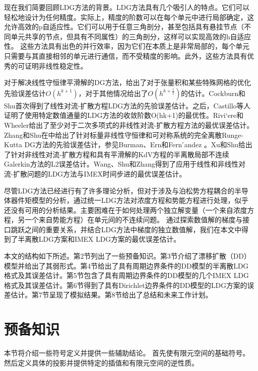 现在我们简要回顾LDG方法的背景。LDG方法具有几个吸引人的特点\parencite{xu2010local}。它们可以轻松地设计为任何精度。实际上，精度的阶数可以在每个单元中进行局部确定，这允许高效的p自适应性。它们可以用于任意三角剖分，甚至包括具有悬挂节点（不同单元共享的节点，但具有不同属性）的三角剖分，这样可以实现高效的h自适应性。
这些方法具有出色的并行效率，因为它们在本质上是非常局部的，每个单元只需要与其直接相邻的单元进行通信，而不受精度的影响。此外，这些方法具有优秀的可证明非线性稳定性。

对于解决线性守恒律平滑解的DG方法，\parencite{richter1988optimalordera,meng2015optimal,lesaint1974finite,johnson1986analysisa,cockburn2008optimala}给出了对于张量积和某些特殊网格的优化先验误差估计$O(h^{k+1})$，对于其他情况给出了$O(h^{k+\frac{1}{2}})$的估计。Cockburn和Shu\parencite{cockburn1998local}首次得到了线性对流-扩散方程LDG方法的先验误差估计。之后，Castillo等人\parencite{castillo2000optimala,castillo2000priorib,castillo2002optimalb}证明了使用特定数值通量的LDG方法的收敛阶数O(hk+1)的最优性。Rivi`ere和Wheeler\parencite{cockburn2000development}给出了至少对于二次多项式的非线性对流-扩散方程方法的最优误差估计。Zhang和Shu在\parencite{zhang2004errorc,zhang2006errorb,zhang2010stabilitya,luo2015priori}中给出了针对标量非线性守恒律和可对称系统的完全离散Runge-Kutta DG方法的先验误差估计，参见Burman、Ern和Fern ́andez \parencite{burman2010explicit}。Xu和Shu\parencite{xu2007errora}给出了针对非线性对流-扩散方程和具有平滑解的KdV方程的半离散局部不连续Galerkin方法的L2误差估计。Wang、Shu和Zhang\parencite{wang2015stability,wang2015stabilityd}得到了应用于线性和非线性对流-扩散问题的LDG方法与IMEX时间步进的最优误差估计。

尽管LDG方法已经进行有了许多理论分析，但对于涉及与泊松势方程耦合的半导体器件矩模型的分析，通过统一LDG方法对浓度方程和势能方程进行处理，似乎还没有可用的分析结果。主要困难在于如何处理两个独立解变量（一个来自浓度方程，另一个来自势能方程）在单元间的不连续问题。
通过探索数值解的梯度与接口跳跃之间的重要关系，并结合LDG方法中梯度的独立数值解，我们在本文中得到了半离散LDG方案和IMEX LDG方案的最优误差估计。

本文的结构如下所述。第2节列出了一些预备知识。第3节介绍了漂移扩散（DD）模型并给出了其弱形式。第4节给出了具有周期边界条件的DD模型的半离散LDG格式及其误差估计。第5节包含了具有周期边界条件的DD模型的几个IMEX LDG格式及其误差估计。第6节得到了具有Dirichlet边界条件的DD模型的LDG方案的误差估计。第7节呈现了模拟结果。第8节给出了总结和未来工作计划。
\section{预备知识}
本节将介绍一些符号定义并提供一些辅助结论。
首先使有限元空间的基础符号。然后定义具体的投影并提供特定的插值和有限元空间的逆性质。
